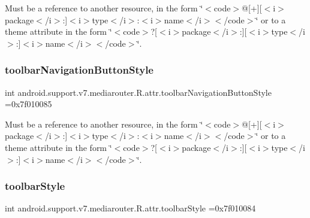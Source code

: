 Must be a reference to another resource, in the form \char`\"{}$<$code$>$@\mbox{[}+\mbox{]}\mbox{[}$<$i$>$package$<$/i$>$\+:\mbox{]}$<$i$>$type$<$/i$>$\+:$<$i$>$name$<$/i$>$$<$/code$>$\char`\"{} or to a theme attribute in the form \char`\"{}$<$code$>$?\mbox{[}$<$i$>$package$<$/i$>$\+:\mbox{]}\mbox{[}$<$i$>$type$<$/i$>$\+:\mbox{]}$<$i$>$name$<$/i$>$$<$/code$>$\char`\"{}. \mbox{\label{classandroid_1_1support_1_1v7_1_1mediarouter_1_1R_1_1attr_ad3987a159610886a0a354b684bfd9c76}} 
\subsubsection{\texorpdfstring{toolbar\+Navigation\+Button\+Style}{toolbarNavigationButtonStyle}}
{\footnotesize\ttfamily int android.\+support.\+v7.\+mediarouter.\+R.\+attr.\+toolbar\+Navigation\+Button\+Style =0x7f010085\hspace{0.3cm}{\ttfamily [static]}}

Must be a reference to another resource, in the form \char`\"{}$<$code$>$@\mbox{[}+\mbox{]}\mbox{[}$<$i$>$package$<$/i$>$\+:\mbox{]}$<$i$>$type$<$/i$>$\+:$<$i$>$name$<$/i$>$$<$/code$>$\char`\"{} or to a theme attribute in the form \char`\"{}$<$code$>$?\mbox{[}$<$i$>$package$<$/i$>$\+:\mbox{]}\mbox{[}$<$i$>$type$<$/i$>$\+:\mbox{]}$<$i$>$name$<$/i$>$$<$/code$>$\char`\"{}. \mbox{\label{classandroid_1_1support_1_1v7_1_1mediarouter_1_1R_1_1attr_a1ce19f1edb30dec57298428b39ef2a46}} 
\subsubsection{\texorpdfstring{toolbar\+Style}{toolbarStyle}}
{\footnotesize\ttfamily int android.\+support.\+v7.\+mediarouter.\+R.\+attr.\+toolbar\+Style =0x7f010084\hspace{0.3cm}{\ttfamily [static]}}

